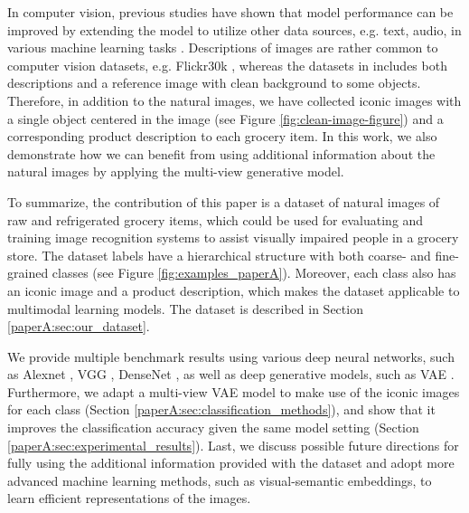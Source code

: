 In computer vision, previous studies have shown that model performance can be improved by extending the model to utilize other data sources, e.g. text, audio, in various machine learning tasks . Descriptions of images are rather common to computer vision datasets, e.g. Flickr30k , whereas the datasets in  includes both descriptions and a reference image with clean background to some objects. Therefore, in addition to the natural images, we have collected iconic images with a single object centered in the image (see Figure \ref{fig:clean-image-figure}) and a corresponding product description to each grocery item. In this work, we also demonstrate how we can benefit from using additional information about the natural images by applying the multi-view generative model.

To summarize, the contribution of this paper is a dataset of natural images of raw and refrigerated grocery items, which could be used for evaluating and training image recognition systems to assist visually impaired people in a grocery store. 
The dataset labels have a hierarchical structure with both coarse- and fine-grained classes (see Figure \ref{fig:examples_paperA}). Moreover, 
each class also has an iconic image and a product description, which makes the dataset applicable to multimodal learning models. The dataset is described in Section \ref{paperA:sec:our_dataset}. 

We provide multiple benchmark results using various deep neural networks, such as Alexnet , VGG , DenseNet , as well as deep generative models, such as VAE . 
Furthermore, we adapt a multi-view VAE model to make use of the iconic images for each class (Section \ref{paperA:sec:classification_methods}), and show that it improves the classification accuracy given the same model setting (Section \ref{paperA:sec:experimental_results}). Last, we discuss possible future directions for fully using the additional information provided with the dataset and adopt more advanced machine learning methods, such as visual-semantic embeddings, to learn efficient representations of the images. 